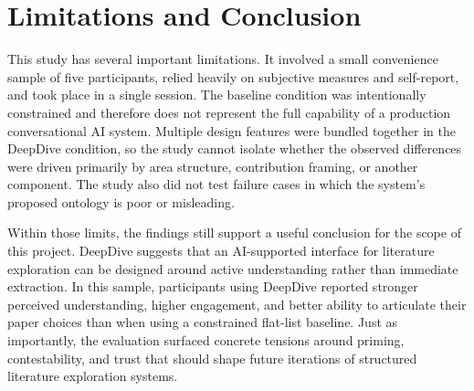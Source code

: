 \documentclass[manuscript,screen]{acmart}
\begin{document}
\section{Limitations and Conclusion}
This study has several important limitations. It involved a small convenience sample of five participants, relied heavily on subjective measures and self-report, and took place in a single session. The baseline condition was intentionally constrained and therefore does not represent the full capability of a production conversational AI system. Multiple design features were bundled together in the DeepDive condition, so the study cannot isolate whether the observed differences were driven primarily by area structure, contribution framing, or another component. The study also did not test failure cases in which the system's proposed ontology is poor or misleading.

Within those limits, the findings still support a useful conclusion for the scope of this project. DeepDive suggests that an AI-supported interface for literature exploration can be designed around active understanding rather than immediate extraction. In this sample, participants using DeepDive reported stronger perceived understanding, higher engagement, and better ability to articulate their paper choices than when using a constrained flat-list baseline. Just as importantly, the evaluation surfaced concrete tensions around priming, contestability, and trust that should shape future iterations of structured literature exploration systems.



\end{document}
